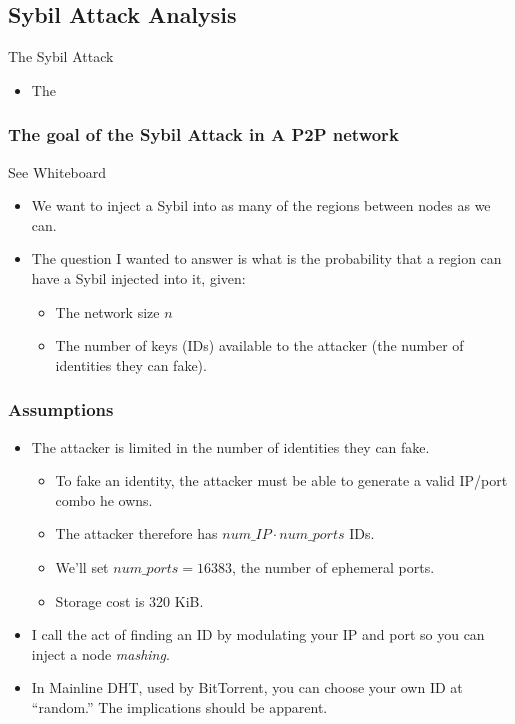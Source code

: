 \documentclass[11pt]{beamer}
\begin{document}
\subsection{Sybil Attack Analysis}

\begin{frame}{The Sybil Attack}
	\begin{itemize}
		\item The 
	\end{itemize}
\end{frame}




\begin{frame}
	\frametitle{The goal of the Sybil Attack in A P2P network}
	See Whiteboard
	\begin{itemize}
		\item We want to inject a Sybil into as many of the regions between nodes as we can.
		\item The question I wanted to answer is what is the probability that a region can have a Sybil injected into it, given:
		\begin{itemize}
			\item The network size $n$
			\item The number of keys (IDs) available to the attacker (the number of identities they can fake).
		\end{itemize}
	\end{itemize}
	\end{frame} 
       
\begin{frame}
\frametitle{Assumptions}
	\begin{itemize}
		\item The attacker is limited in the number of identities they can fake.
		
		\begin{itemize}
			\item To fake an identity, the attacker must be able to generate a valid IP/port combo he owns.
			\item The attacker therefore has $num\_IP \cdot num\_ports$ IDs.
			\item We'll set $ num\_ports = 16383 $, the number of ephemeral ports.
			\item Storage cost is 320 KiB.
		\end{itemize}
		\item I call the act of finding an ID by modulating your IP and port so you can inject a node \emph{mashing}.
		\item In Mainline DHT, used by BitTorrent, you can choose your own ID at ``random.''   The implications should be apparent.
	
	\end{itemize}
\end{frame}
\end{document}
